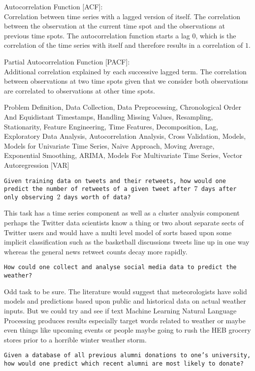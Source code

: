 Autocorrelation Function [ACF]: \\
Correlation between time series with a lagged version of itself. The correlation between the observation at the current time spot and the observations at previous time spots. The autocorrelation function starts a lag $0$, which is the correlation of the time series with itself and therefore results in a correlation of $1$.

Partial Autocorrelation Function [PACF]: \\
Additional correlation explained by each successive lagged term. The correlation between observations at two time spots given that we consider both observations are correlated to observations at other time spots.

Problem Definition, Data Collection, Data Preprocessing, Chronological Order And Equidistant Timestamps, Handling Missing Values, Resampling, Stationarity, Feature Engineering, Time Features, Decomposition, Lag, Exploratory Data Analysis, Autocorrelation Analysis, Cross Validation, Models, Models for Univariate Time Series, Naive Approach, Moving Average, Exponential Smoothing, ARIMA, Models For Multivariate Time Series, Vector Autoregression [VAR]

\texttt{Given training data on tweets and their retweets, how would one predict the number of retweets of a given tweet after $7$ days after only observing $2$ days worth of data?}

This task has a time series component as well as a cluster analysis component perhaps the Twitter data scientists know a thing or two about separate sects of Twitter users and would have a multi level model of sorts based upon some implicit classification such as the basketball discussions tweets line up in one way whereas the general news retweet counts decay more rapidly.

\texttt{How could one collect and analyse social media data to predict the weather?}

Odd task to be sure. The literature would suggest that meteorologists have solid models and predictions based upon public and historical data on actual weather inputs. But we could try and see if text Machine Learning Natural Language Processing produces results especially target words related to weather or maybe even things like upcoming events or people maybe going to rush the HEB grocery stores prior to a horrible winter weather storm.

\texttt{Given a database of all previous alumni donations to one's university, how would one predict which recent alumni are most likely to donate?}

